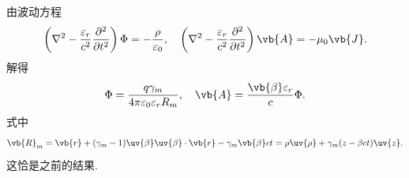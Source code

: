 \begin{notes}
	由波动方程
	\begin{equation*}
		\left( \nabla^{2} - \frac{\varepsilon_{r}}{c^{2}} \frac{\partial^{2}}{\partial t^{2}} \right) \Phi = -\frac{\rho}{\varepsilon_{0}}, \quad
		\left( \nabla^{2} - \frac{\varepsilon_{r}}{c^{2}} \frac{\partial^{2}}{\partial t^{2}} \right) \vb{A} = -\mu_{0} \vb{J}.
	\end{equation*}
	解得
	\begin{equation*}
		\Phi = \frac{q \gamma_{m}}{4\pi \varepsilon_{0} \varepsilon_{r} R_{m}}, \quad
		\vb{A} = \frac{\vb{\beta} \varepsilon_{r}}{c} \Phi.
	\end{equation*}
	式中
	\begin{equation*}
		\vb{R}_{m} = \vb{r} + (\gamma_{m} - 1) \uv{\beta} \uv{\beta} \cdot \vb{r} - \gamma_{m} \vb{\beta} c t = \rho \uv{\rho} + \gamma_{m} (z - \beta c t) \uv{z}.
	\end{equation*}
	这恰是之前的结果.
\end{notes}


